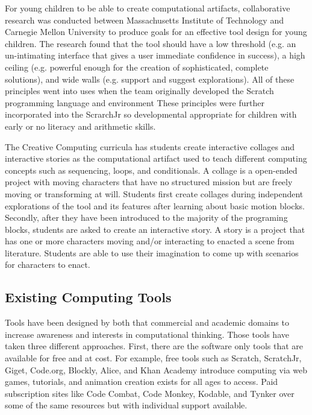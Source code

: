 \documentclass[11pt, letterpaper, onecolumn]{article}
\begin{document}
%
For young children to be able to create computational artifacts, collaborative research was conducted between Massachusetts Institute of Technology and Carnegie Mellon University to produce goals for an effective tool design for young children.
%
The research found that the tool should have a low threshold (e.g. an un-intimating interface that gives a user immediate confidence in success), a high ceiling (e.g. powerful enough for the creation of sophisticated, complete solutions),  and wide walls (e.g. support and suggest explorations).
%
All of these principles went into uses when the team originally developed the Scratch programming language and environment 
%
These principles were further incorporated into the ScrarchJr so developmental appropriate for children with early or no literacy and arithmetic skills.

%
The Creative Computing curricula has students create interactive collages and interactive stories as the computational artifact used to teach different computing concepts such as sequencing, loops, and conditionals.
%
A collage is a open-ended project with moving characters that have no structured mission but are freely moving or transforming at will.
%
Students first create collages during independent explorations of the tool and its features after learning about basic motion blocks.
%
Secondly, after they have been introduced to the majority of the programing blocks, students are asked to create an interactive story.
%
A story is a project that has one or more characters moving and/or interacting to enacted a scene from literature.
%
Students are able to use their imagination to come up with scenarios for characters to enact.

\subsection{Existing Computing Tools}
%
Tools have been designed by both that commercial and academic domains to increase awareness and interests in computational thinking.
%
Those tools have taken three different approaches.
%
First, there are the software only tools that are available for free and at cost. 
%
For example, free tools such as Scratch, ScratchJr, Giget, Code.org, Blockly, Alice, and Khan Academy introduce computing via web games, tutorials, and animation creation exists for all ages to access. 
%
Paid subscription sites like Code Combat, Code Monkey, Kodable, and Tynker over some of the same resources but with individual support available.
\end{document}
